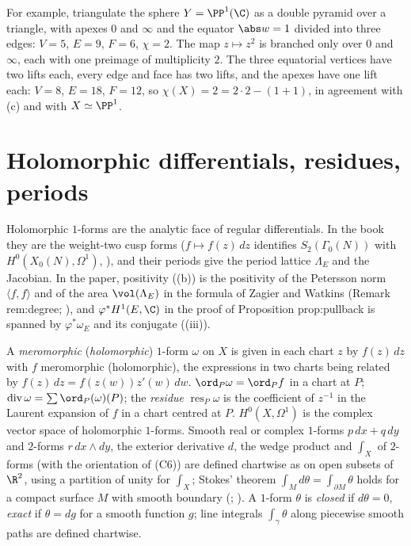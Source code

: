 For example, triangulate the sphere $Y=\PP^1(\C)$ as a double pyramid over a triangle, with apexes $0$ and $\infty$ and the equator $\abs w=1$ divided into three
edges: $V=5$, $E=9$, $F=6$, $\chi=2$. The map $z\mapsto z^2$ is branched only over $0$ and $\infty$, each with one preimage of multiplicity $2$. The three
equatorial vertices have two lifts each, every edge and face has two lifts, and the apexes have one lift each: $V=8$, $E=18$, $F=12$, so $\chi(X)=2=2\cdot2-(1+1)$,
in agreement with (c) and with $X\simeq\PP^1$.

\section{Holomorphic differentials, residues, periods}\label{sec:curves:differentials-analytic}

Holomorphic $1$-forms are the analytic face of regular differentials. In the book they are the weight-two cusp forms ($f\mapsto f(z)\,dz$ identifies
$S_2(\Gamma_0(N))$ with $H^0(X_0(N),\Omega^1)$, ), and their periods give the period lattice $\Lambda_E$ and the Jacobian. In the paper, positivity
((b)) is the positivity of the Petersson norm $\langle f,f\rangle$ and of the area $\vol(\Lambda_E)$ in the formula of Zagier and
Watkins (Remark rem:degree; ), and $\varphi^*H^1(E,\C)$ in the proof of Proposition prop:pullback is spanned by $\varphi^*\omega_E$ and its conjugate
((iii)).

\begin{definition}\label{def:curves:holomorphic-differential}
A \emph{meromorphic} (\emph{holomorphic}) $1$-form $\omega$ on $X$ is given in each chart $z$ by $f(z)\,dz$ with $f$ meromorphic (holomorphic), the expressions in two charts
being related by $f(z)\,dz=f(z(w))z'(w)\,dw$. $\ord_P\omega=\ord_Pf$ in a chart at $P$; $\operatorname{div}\omega=\sum\ord_P(\omega)(P)$; the \emph{residue} $\operatorname{res}_P\omega$ is the coefficient
of $z^{-1}$ in the Laurent expansion of $f$ in a chart centred at $P$. $H^0(X,\Omega^1)$ is the complex vector space of holomorphic $1$-forms. Smooth real or complex
$1$-forms $p\,dx+q\,dy$ and $2$-forms $r\,dx\wedge dy$, the exterior derivative $d$, the wedge product and $\int_X$ of $2$-forms (with the orientation of
(C6)) are defined chartwise as on open subsets of $\R^2$, using a partition of unity for $\int_X$; Stokes' theorem $\int_M d\theta=\int_{\partial M}\theta$
holds for a compact surface $M$ with smooth boundary (; \cite[Chapter IV]{Miranda}). A $1$-form $\theta$ is \emph{closed} if $d\theta=0$, \emph{exact} if
$\theta=dg$ for a smooth function $g$; line integrals $\int_\gamma\theta$ along piecewise smooth paths are defined chartwise.
\end{definition}

